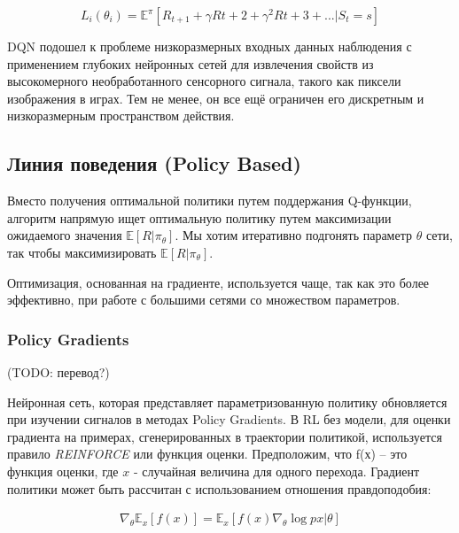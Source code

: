 \begin{equation} \label{eq:someEq}
L_i(\theta_i) = \mathbb{E}^\pi [R_{t+1} + \gamma R{t+2} + \gamma^2 R{t+3} + ... |S_t = s]
\end{equation}


DQN подошел к проблеме низкоразмерных входных данных наблюдения с применением глубоких нейронных сетей для извлечения свойств из высокомерного необработанного сенсорного сигнала, такого как пиксели изображения в играх. Тем не менее, он все ещё ограничен его дискретным и низкоразмерным пространством действия.

\subsection{Линия поведения (Policy Based)}

Вместо получения оптимальной политики путем поддержания Q-функции, алгоритм напрямую ищет оптимальную политику путем максимизации ожидаемого значения $\mathbb{E}[R|\pi_\theta]$. Мы хотим итеративно подгонять параметр $\theta$ сети, так чтобы максимизировать $\mathbb{E}[R|\pi_\theta]$.

Оптимизация, основанная на градиенте, используется чаще, так как это более эффективно, при работе с большими сетями со множеством параметров. \cite{Arulkumaran_2017}

\subsubsection{Policy Gradients} (TODO: перевод?)

Нейронная сеть, которая представляет параметризованную политику обновляется при изучении сигналов в методах Policy Gradients. В RL без модели, для оценки градиента на примерах, сгенерированных в траектории политикой, используется правило {\itshape REINFORCE} или функция оценки. Предположим, что f(х) – это функция оценки, где $x$ - случайная величина для одного перехода. Градиент политики может быть рассчитан с использованием отношения правдоподобия:

\begin{equation}
	\label{eq:ch1-likelihood-ratios}
	\begin{multlined}
		\nabla_\theta \mathbb{E}_x[f(x)] = \mathbb{E}_x[f(x) \nabla_\theta \log p x|\theta]
	\end{multlined}
\end{equation}

